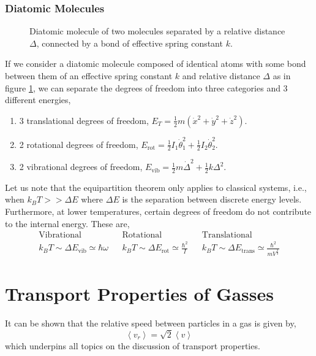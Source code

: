 \documentclass{book}
\begin{document}
\subsection{Diatomic Molecules}
\begin{figure}[b]
	\centering
{}
\caption{Diatomic molecule of two molecules separated by a relative distance $\Delta$, connected by a bond of effective spring constant $k$.}
\label{fig:diatomic}
\end{figure}
If we consider a diatomic molecule composed of identical atoms with some bond between them of an effective spring constant $k$ and relative distance $\Delta$ as in figure \ref{fig:diatomic}, we can separate the degrees of freedom into three categories and 3 different energies,
\begin{enumerate}
	\item 3 translational degrees of freedom, $E_T = \frac{1}{2}m\left(\Dot{x}^2 + \Dot{y}^2 + \Dot{z}^2\right)$.
	\item 2 rotational degrees of freedom, $E_{\text{rot}} = \frac{1}{2} I_1\Dot{\theta}_1^2 + \frac{1}{2}I_2\Dot{\theta}_2^2$.
	\item 2 vibrational degrees of freedom, $E_{\text{vib}} = \frac{1}{2}m\Dot{\Delta}^2 + \frac{1}{2}k\Delta^2$.
\end{enumerate}
Let us note that the equipartition theorem only applies to classical systems, i.e., when $k_B T >> \Delta E$ where $\Delta E$ is the separation between discrete energy levels. Furthermore, at lower temperatures, certain degrees of freedom do not contribute to the internal energy. These are,
\begin{align}
	\text{Vibrational} && \text{Rotational} && \text{Translational} \\
	k_BT \sim \Delta E_{\text{vib}} \simeq \hbar \omega && k_BT \sim \Delta E_{\text{rot}} \simeq \frac{\hbar^2}{I} && k_BT \sim \Delta E_{\text{trans}} \simeq \frac{\hbar^2}{mV^{\frac{2}{3}}}
\end{align}
\chapter{Transport Properties of Gasses}
It can be shown that the relative speed between particles in a gas is given by,
\begin{equation}
	\left<v_r\right> = \sqrt{2}\left<v\right>
\end{equation}
which underpins all topics on the discussion of transport properties.
\end{document}
